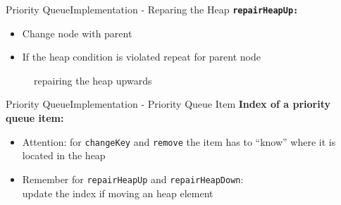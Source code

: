 \begin{frame}{Priority Queue}{Implementation - Reparing the Heap}
  {\color{Mittel-Blau}\texttt{\textbf{repairHeapUp:}}}
  \begin{itemize}
    \item
      Change node with parent
    \item
      If the {\color{Mittel-Blau}heap condition} is violated repeat for parent
      node
  \end{itemize}
  \begin{center}
    \begin{figure}[!h]%
      \begin{columns}%
        \begin{column}{0.45\linewidth}%
          \begin{adjustbox}{width=\linewidth}%
          \end{adjustbox}%
        \end{column}%
        \begin{column}{0.45\linewidth}%
          \begin{adjustbox}{width=\linewidth}%
          \end{adjustbox}%
        \end{column}%
      \end{columns}%
      \caption{repairing the heap upwards}%
      \label{fig:priority_queue:impl_repair_heap_up2}%
    \end{figure}
  \end{center}
\end{frame}


\begin{frame}{Priority Queue}{Implementation - Priority Queue Item}
  \textbf{Index of a priority queue item:}
  \begin{itemize}
    \item<2->
      {\color{red}Attention:}
      for {\color{Mittel-Blau}\texttt{changeKey}} and
      {\color{Mittel-Blau}\texttt{remove}} the item has to \enquote{know} where
      it is located in the heap
    \item<3->
      Remember for {\color{Mittel-Blau}\texttt{repairHeapUp}} and
      {\color{Mittel-Blau}\texttt{repairHeapDown}}:\\
      update the index if moving an heap element
  \end{itemize}
\end{frame}

